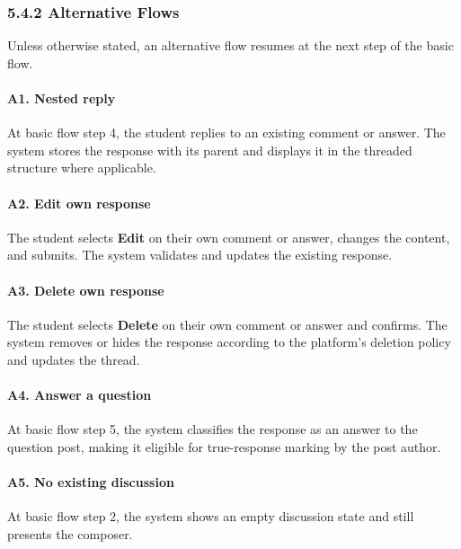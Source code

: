 \documentclass[12pt]{article}
\begin{document}
\subsubsection*{5.4.2 Alternative Flows}
\par\medskip
Unless otherwise stated, an alternative flow resumes at the next step of the basic flow.
\par\medskip
\hypertarget{sec:a1-nested-reply}{}
\paragraph*{A1. Nested reply}
\par\medskip
At basic flow step 4, the student replies to an existing comment or answer. The system stores the response with its parent and displays it in the threaded structure where applicable.
\par\medskip
\hypertarget{sec:a2-edit-own-response}{}
\paragraph*{A2. Edit own response}
\par\medskip
The student selects \textbf{Edit} on their own comment or answer, changes the content, and submits. The system validates and updates the existing response.
\par\medskip
\hypertarget{sec:a3-delete-own-response}{}
\paragraph*{A3. Delete own response}
\par\medskip
The student selects \textbf{Delete} on their own comment or answer and confirms. The system removes or hides the response according to the platform's deletion policy and updates the thread.
\par\medskip
\hypertarget{sec:a4-answer-a-question}{}
\paragraph*{A4. Answer a question}
\par\medskip
At basic flow step 5, the system classifies the response as an answer to the question post, making it eligible for true-response marking by the post author.
\par\medskip
\hypertarget{sec:a5-no-existing-discussion}{}
\paragraph*{A5. No existing discussion}
\par\medskip
At basic flow step 2, the system shows an empty discussion state and still presents the composer.
\par\medskip
\hypertarget{sec:e1-empty-or-invalid-response}{}
\end{document}
